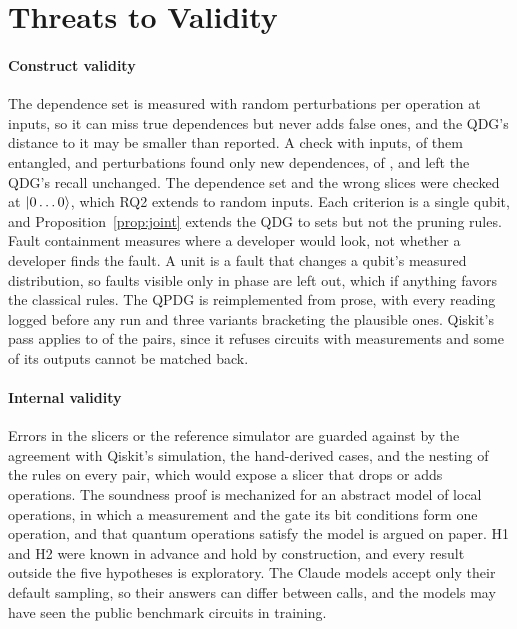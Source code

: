 \section{Threats to Validity}\label{sec:threats}

\paragraph*{Construct validity}
The dependence set is measured with \numInfluencePerturbations{} random perturbations per operation at
\numInfluenceInputs{} inputs, so it can miss true dependences but never adds false ones, and the QDG's distance to it
may be smaller than reported. A check with \numGcInputs{} inputs, \numGcEntangledInputs{} of them entangled, and
\numGcPerturbations{} perturbations found only \numGcDepsNew{} new dependences, \numGcDepsNewPct{} of
\numGcDepsBefore{}, and left the QDG's recall unchanged. The dependence set and the wrong slices were checked at $\lvert 0\dots0\rangle$,
which RQ2 extends to random inputs. Each criterion is a single qubit, and Proposition~\ref{prop:joint} extends the QDG to
sets but not the pruning rules. Fault containment measures where a developer would look, not whether a developer finds
the fault. A unit is a fault that changes a qubit's measured distribution, so faults visible only in phase are left
out, which if anything favors the classical rules. The QPDG is reimplemented from prose, with every reading logged before any run and three variants
bracketing the plausible ones. Qiskit's pass applies to \numLcqApplicable{} of the \numNPairs{} pairs, since it refuses
circuits with measurements and some of its outputs cannot be matched back.

\paragraph*{Internal validity}
Errors in the slicers or the reference simulator are guarded against by the agreement with Qiskit's simulation, the
\numCatEntries{} hand-derived cases, and the nesting of the rules on every pair, which would expose a slicer that
drops or adds operations. The soundness proof is mechanized for an abstract model of local
operations, in which a measurement and the gate its bit conditions form one operation, and that quantum operations
satisfy the model is argued on paper. H1 and H2 were known in advance and hold by
construction, and every result outside the five hypotheses is exploratory. The Claude models accept only their default sampling, so their
answers can differ between calls, and the models may have seen the public benchmark circuits in training.

